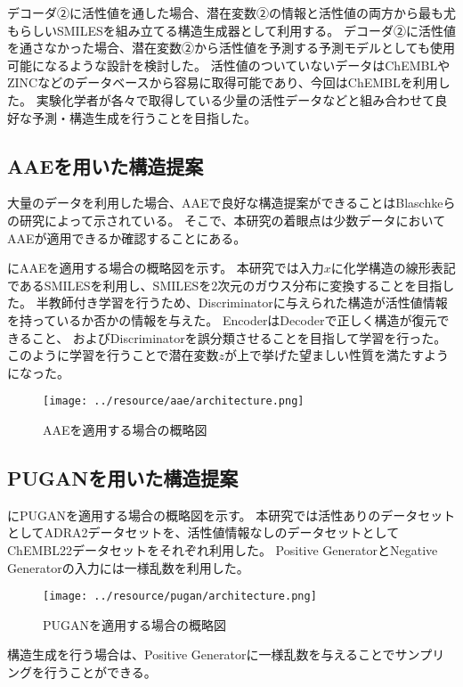 デコーダ②に活性値を通した場合、潜在変数②の情報と活性値の両方から最も尤もらしいSMILESを組み立てる構造生成器として利用する。
デコーダ②に活性値を通さなかった場合、潜在変数②から活性値を予測する予測モデルとしても使用可能になるような設計を検討した。
活性値のついていないデータはChEMBL\cite{chembl22}やZINC\cite{zinc12, zinc15}などのデータベースから容易に取得可能であり、今回はChEMBLを利用した。
実験化学者が各々で取得している少量の活性データなどと組み合わせて良好な予測・構造生成を行うことを目指した。

\subsection{AAEを用いた構造提案}

大量のデータを利用した場合、AAEで良好な構造提案ができることはBlaschkeらの研究\cite{Blaschke2018}によって示されている。
そこで、本研究の着眼点は少数データにおいてAAEが適用できるか確認することにある。

にAAEを適用する場合の概略図を示す。
本研究では入力$x$に化学構造の線形表記であるSMILESを利用し、SMILESを2次元のガウス分布に変換することを目指した。
半教師付き学習を行うため、Discriminatorに与えられた構造が活性値情報を持っているか否かの情報を与えた。
EncoderはDecoderで正しく構造が復元できること、
およびDiscriminatorを誤分類させることを目指して学習を行った。
このように学習を行うことで潜在変数$z$が上で挙げた望ましい性質を満たすようになった。
\begin{figure}[tbp]
    \centering
    \texttt{[image: ../resource/aae/architecture.png]}
    \caption{AAEを適用する場合の概略図} \label{fig:aae_architecture}
\end{figure}

\subsection{PUGANを用いた構造提案}

にPUGANを適用する場合の概略図を示す。
本研究では活性ありのデータセットとしてADRA2データセットを、活性値情報なしのデータセットとしてChEMBL22データセットをそれぞれ利用した。
Positive GeneratorとNegative Generatorの入力には一様乱数を利用した。
\begin{figure}[tbp]
    \centering
    \texttt{[image: ../resource/pugan/architecture.png]}
    \caption{PUGANを適用する場合の概略図} \label{fig:pugan_architecture}
\end{figure}

構造生成を行う場合は、Positive Generatorに一様乱数を与えることでサンプリングを行うことができる。

